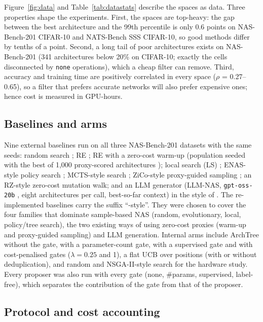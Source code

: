 \documentclass{sadhana}
\newcommand{\algname}{ArchTree}
\begin{document}
Figure~\ref{fig:data} and Table~\ref{tab:datastats} describe the spaces as data. Three properties shape the experiments. First, the spaces are top-heavy: the gap between the best architecture and the 99th percentile is only 0.6 points on NAS-Bench-201 CIFAR-10 and NATS-Bench SSS CIFAR-10, so good methods differ by tenths of a point. Second, a long tail of poor architectures exists on NAS-Bench-201 (341 architectures below 20\% on CIFAR-10; exactly the cells disconnected by \texttt{none} operations), which a cheap filter can remove. Third, accuracy and training time are positively correlated in every space ($\rho$ = 0.27--0.65), so a filter that prefers accurate networks will also prefer expensive ones; hence cost is measured in GPU-hours.

\subsection{Baselines and arms}

Nine external baselines run on all three NAS-Bench-201 datasets with the same seeds: random search \cite{li2020random}; RE \cite{real2019}; RE with a zero-cost warm-up (population seeded with the best of 1,000 proxy-scored architectures \cite{abdelfattah2021}); local search (LS) \cite{white2021ls}; ENAS-style policy search \cite{pham2018}; MCTS-style search \cite{wang2020alphax}; ZiCo-style proxy-guided sampling \cite{li2023zico}; an RZ-style zero-cost mutation walk; and an LLM generator (LLM-NAS, \texttt{gpt-oss-20b} \cite{openai2025gptoss}, eight architectures per call, best-so-far context) in the style of \cite{zheng2023genius}. The re-implemented baselines carry the suffix ``-style''. They were chosen to cover the four families that dominate sample-based NAS (random, evolutionary, local, policy/tree search), the two existing ways of using zero-cost proxies (warm-up and proxy-guided sampling) and LLM generation. Internal arms include \algname{} without the gate, with a parameter-count gate, with a supervised gate and with cost-penalised gates ($\lambda=0.25$ and 1), a flat UCB over positions (with or without deduplication), and random and NSGA-II-style \cite{deb2002} search for the hardware study. Every proposer was also run with every gate (none, \#params, supervised, label-free), which separates the contribution of the gate from that of the proposer.

\subsection{Protocol and cost accounting}
\end{document}
